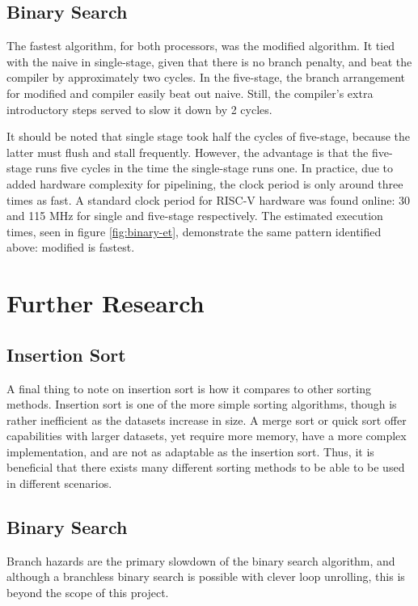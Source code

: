 \documentclass[lettersize,journal]{IEEEtran}
\begin{document}
	\subsection{Binary Search}
    The fastest algorithm, for both processors, was the modified algorithm. It tied with the naive in single-stage, given that there is no branch penalty, and beat the compiler by approximately two cycles. In the five-stage, the branch arrangement for modified and compiler easily beat out naive. Still, the compiler's extra introductory steps served to slow it down by 2 cycles.

    It should be noted that single stage took half the cycles of five-stage, because the latter must flush and stall frequently. However, the advantage is that the five-stage runs five cycles in the time the single-stage runs one. In practice, due to added hardware complexity for pipelining, the clock period is only around three times as fast. A standard clock period for RISC-V hardware was found online: 30 and 115 MHz for single and five-stage respectively. The estimated execution times, seen in figure \ref{fig:binary-et}, demonstrate the same pattern identified above: modified is fastest.

\section{Further Research}
  \subsection{Insertion Sort}
		A final thing to note on insertion sort is how it compares to other sorting methods. Insertion sort is one of the more simple sorting algorithms, though is rather inefficient as the datasets increase in size. A merge sort or quick sort offer capabilities with larger datasets, yet require more memory, have a more complex implementation, and are not as adaptable as the insertion sort\cite{ref4}. Thus, it is beneficial that there exists many different sorting methods to be able to be used in different scenarios.
	\subsection{Binary Search}
    Branch hazards are the primary slowdown of the binary search algorithm, and although a branchless binary search is possible with clever loop unrolling\cite{ref2}\cite{ref3}, this is beyond the scope of this project.
\end{document}
